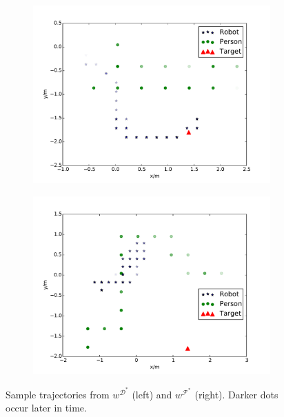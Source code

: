 \documentclass{aamas2016}
\begin{document}
\begin{figure}[t]
  \hspace{-10pt}
  \begin{subfigure}{0.22\textwidth}
    \includegraphics[scale = 0.22]{images/gp.pdf}
    \label{fig:good_path}
  \end{subfigure}
  \hspace{10pt}
  \begin{subfigure}{0.22\textwidth}
    \includegraphics[scale = 0.22]{images/bp.pdf}
    \label{fig:bad_path}
\end{subfigure}
  \caption{\small{Sample trajectories from $w^{\mathcal{D}^*}$ (left) and $w^{\mathcal{F}^*}$ (right). Darker dots occur later in time.}} %
  \label{fig:paths}
\end{figure}
\end{document}
